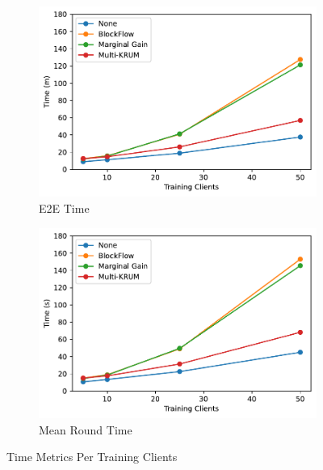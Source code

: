 \begin{figure}[!hb]
    \centering
    \begin{subfigure}[b]{0.49\textwidth}
        \centering
        \includegraphics[width=\textwidth]{graphics/clients/e2e.pdf}
        \caption{E2E Time}
    \end{subfigure}
    \hfill
    \begin{subfigure}[b]{0.49\textwidth}
        \centering
        \includegraphics[width=\textwidth]{graphics/clients/round.pdf}
        \caption{Mean Round Time}
    \end{subfigure}
    \caption{Time Metrics Per Training Clients}
    \label{fig:clients_time}
\end{figure}

